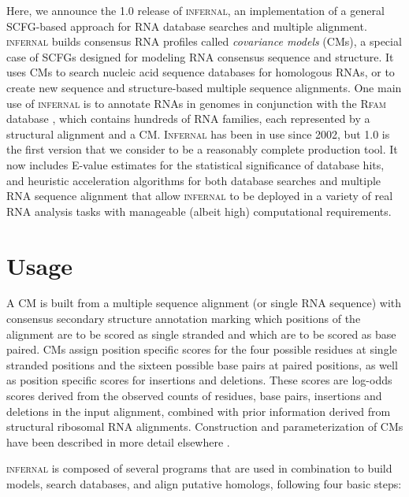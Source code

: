 \documentclass[11pt]{article}
\begin{document}
Here, we announce the 1.0 release of \textsc{infernal}, an
implementation of a general SCFG-based approach for RNA database
searches and multiple alignment. \textsc{infernal} builds consensus
RNA profiles called \emph{covariance models} (CMs), a special case of
SCFGs designed for modeling RNA consensus sequence and structure. It
uses CMs to search nucleic acid sequence databases for homologous
RNAs, or to create new sequence and structure-based multiple sequence
alignments. One main use of \textsc{infernal} is to annotate RNAs in
genomes in conjunction with the \textsc{Rfam} database
\citep{Griffiths-Jones05}, which contains hundreds of RNA families,
each represented by a structural alignment and a CM. \textsc{Infernal}
has been in use since 2002, but 1.0 is the first version that we
consider to be a reasonably complete production tool. It now includes
E-value estimates for the statistical significance of database hits,
and heuristic acceleration algorithms for both database searches and
multiple RNA sequence alignment that allow \textsc{infernal} to be
deployed in a variety of real RNA analysis tasks with manageable
(albeit high) computational requirements.

\section{Usage} 

A CM is built from a multiple sequence alignment (or single RNA
sequence) with consensus secondary structure annotation marking which
positions of the alignment are to be scored as single stranded and
which are to be scored as base paired. CMs assign position specific
scores for the four possible residues at single stranded positions and
the sixteen possible base pairs at paired positions, as well as
position specific scores for insertions and deletions. These scores
are log-odds scores derived from the observed counts of residues, base
pairs, insertions and deletions in the input alignment, combined with
prior information derived from structural ribosomal RNA
alignments. Construction and parameterization of CMs have been
described in more detail elsewhere
\citep{Eddy94,infguide03,Eddy02b,NawrockiEddy07}.

\textsc{infernal} is composed of several programs that are used in
combination to build models, search databases, and align putative
homologs, following four basic steps:
\end{document}

